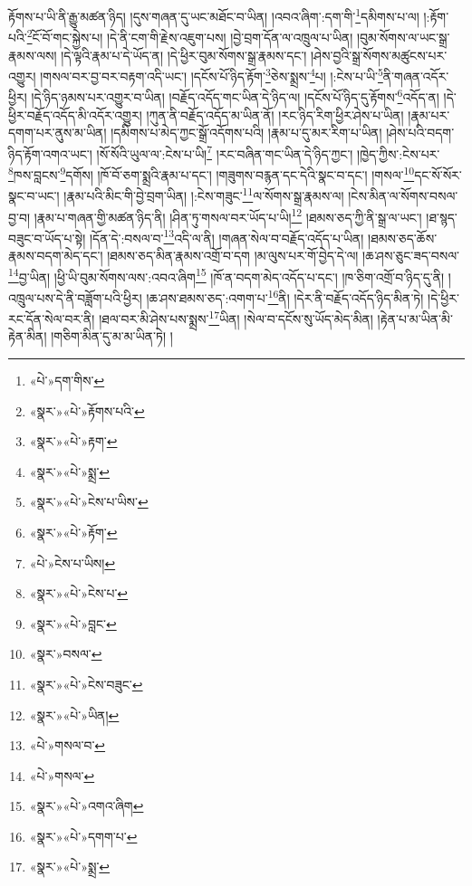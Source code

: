རྟོགས་པ་ཡི་ནི་རྒྱུ་མཚན་ཉིད། །དུས་གཞན་དུ་ཡང་མཐོང་བ་ཡིན། །འབའ་ཞིག་:དག་གི་\footnote{«པེ་»དག་གིས་}དམིགས་པ་ལ། །:རྟོག་པའི་\footnote{«སྣར་»«པེ་»རྟོགས་པའི་}ངོ་བོ་གང་སྐྱེས་པ། །དེ་ནི་ངག་གི་རྗེས་འཇུག་པས། །བྱེ་བྲག་དོན་ལ་འཁྲུལ་པ་ཡིན། །བུམ་སོགས་ལ་ཡང་སྒྲ་རྣམས་ལས། །དེ་ལྟའི་རྣམ་པ་དེ་ཡོད་ན། །དེ་ཕྱིར་བུམ་སོགས་སྒྲ་རྣམས་དང་། །ཤེས་བྱའི་སྒྲ་སོགས་མཚུངས་པར་འགྱུར། །གསལ་བར་བྱ་བར་བརྟག་འདི་ཡང་། །དངོས་པོ་ཉིད་རྟོག་\footnote{«སྣར་»«པེ་»རྟག་}ཅེས་སྨྲས་\footnote{«སྣར་»«པེ་»སྨྲ་}པ། །:ངེས་པ་ཡི་\footnote{«སྣར་»«པེ་»ངེས་པ་ཡིས་}ནི་གཞན་འདོར་ཕྱིར། །དེ་ཉིད་ཉམས་པར་འགྱུར་བ་ཡིན། །བརྗོད་འདོད་གང་ཡིན་དེ་ཉིད་ལ། །དངོས་པོ་ཉིད་དུ་རྟོགས་\footnote{«སྣར་»«པེ་»རྟོག་}འདོད་ན། །དེ་ཕྱིར་བརྗོད་འདོད་མི་འདོར་འགྱུར། །ཀུན་ནི་བརྗོད་འདོད་མ་ཡིན་ནོ། །རང་ཉིད་རིག་ཕྱིར་ཤེས་པ་ཡིན། །རྣམ་པར་དགག་པར་ནུས་མ་ཡིན། །དམིགས་པ་མེད་ཀྱང་སྒྲོ་འདོགས་པའི། །རྣམ་པ་དུ་མར་རིག་པ་ཡིན། །ཤེས་པའི་བདག་ཉིད་རྟོག་འགའ་ཡང་། །སོ་སོའི་ཡུལ་ལ་:ངེས་པ་ཡི།\footnote{«པེ་»ངེས་པ་ཡིས།} །རང་བཞིན་གང་ཡིན་དེ་ཉིད་ཀྱང་། །ཁྱེད་ཀྱིས་:ངེས་པར་\footnote{«སྣར་»«པེ་»ངེས་པ་}ཁས་བླངས་\footnote{«སྣར་»«པེ་»བླང་}དགོས། །ཁོ་བོ་ཅག་སྨྲའི་རྣམ་པ་དང་། །གཟུགས་བརྙན་དང་དེའི་སྣང་བ་དང་། །གསལ་\footnote{«སྣར་»བསལ་}དང་སོ་སོར་སྣང་བ་ཡང་། །རྣམ་པའི་མིང་གི་བྱེ་བྲག་ཡིན། །:ངེས་གཟུང་\footnote{«སྣར་»«པེ་»ངེས་བཟུང་}ལ་སོགས་སྒྲ་རྣམས་ལ། །ངེས་མིན་ལ་སོགས་བསལ་བྱ་བ། །རྣམ་པ་གཞན་གྱི་མཚན་ཉིད་ནི། །ཤིན་ཏུ་གསལ་བར་ཡོད་པ་ཡི།\footnote{«སྣར་»«པེ་»ཡིན།} །ཐམས་ཅད་ཀྱི་ནི་སྒྲ་ལ་ཡང་། །ཐ་སྙད་བཟུང་བ་ཡོད་པ་སྟེ། །དོན་དེ་:བསལ་བ་\footnote{«པེ་»གསལ་བ་}འདི་ལ་ནི། །གཞན་སེལ་བ་བརྗོད་འདོད་པ་ཡིན། །ཐམས་ཅད་ཆོས་རྣམས་བདག་མེད་དང་། །ཐམས་ཅད་མིན་རྣམས་འགྲོ་བ་དག །མ་ལུས་པར་གོ་བྱེད་དེ་ལ། །ཆ་ཤས་ཅུང་ཟད་བསལ་\footnote{«པེ་»གསལ་}བྱ་ཡིན། །ཕྱི་ཡི་བུམ་སོགས་ལས་:འབའ་ཞིག\footnote{«སྣར་»«པེ་»འགའ་ཞིག} །ཁོ་ན་བདག་མེད་འདོད་པ་དང་། །ཁ་ཅིག་འགྲོ་བ་ཉིད་དུ་ནི། །འཁྲུལ་པས་དེ་ནི་བཟློག་པའི་ཕྱིར། །ཆ་ཤས་ཐམས་ཅད་:འགག་པ་\footnote{«སྣར་»«པེ་»དགག་པ་}ནི། །དེར་ནི་བརྗོད་འདོད་ཉིད་མིན་ཏེ། །དེ་ཕྱིར་རང་དོན་སེལ་བར་ནི། །ཐལ་བར་མི་ཤེས་པས་སྨྲས་\footnote{«སྣར་»«པེ་»སྨྲ་}ཡིན། །སེལ་བ་དངོས་སུ་ཡོད་མེད་མིན། །རྟེན་པ་མ་ཡིན་མི་རྟེན་མིན། །གཅིག་མིན་དུ་མ་མ་ཡིན་ཏེ། །
